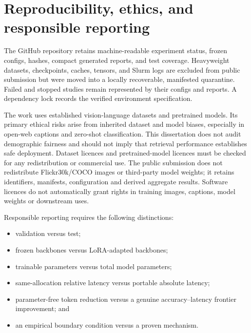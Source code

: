 \chapter{Reproducibility, ethics, and responsible reporting}
The GitHub repository retains machine-readable experiment status, frozen configs, hashes, compact generated reports, and test coverage. Heavyweight datasets, checkpoints, caches, tensors, and Slurm logs are excluded from public submission but were moved into a locally recoverable, manifested quarantine. Failed and stopped studies remain represented by their configs and reports. A dependency lock records the verified environment specification.

The work uses established vision-language datasets and pretrained models. Its primary ethical risks arise from inherited dataset and model biases, especially in open-web captions and zero-shot classification. This dissertation does not audit demographic fairness and should not imply that retrieval performance establishes safe deployment. Dataset licences and pretrained-model licences must be checked for any redistribution or commercial use. The public submission does not redistribute Flickr30k/COCO images or third-party model weights; it retains identifiers, manifests, configuration and derived aggregate results. Software licences do not automatically grant rights in training images, captions, model weights or downstream uses.

Responsible reporting requires the following distinctions:

\begin{itemize}
\item validation versus test;
\item frozen backbones versus LoRA-adapted backbones;
\item trainable parameters versus total model parameters;
\item same-allocation relative latency versus portable absolute latency;
\item parameter-free token reduction versus a genuine accuracy--latency frontier improvement; and
\item an empirical boundary condition versus a proven mechanism.
\end{itemize}
